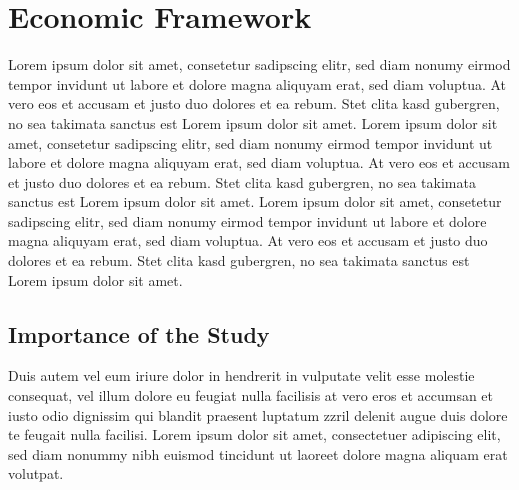 \chapter{Economic Framework}
Lorem ipsum dolor sit amet, consetetur sadipscing elitr,  sed diam nonumy eirmod
tempor invidunt ut labore et dolore magna aliquyam erat, sed diam voluptua. At
vero eos et accusam et justo duo dolores et ea rebum. Stet clita kasd gubergren,
no sea takimata sanctus est Lorem ipsum dolor sit amet. Lorem ipsum dolor sit
amet, consetetur sadipscing elitr,  sed diam nonumy eirmod tempor invidunt ut
labore et dolore magna aliquyam erat, sed diam voluptua. At vero eos et accusam
et justo duo dolores et ea rebum. Stet clita kasd gubergren, no sea takimata
sanctus est Lorem ipsum dolor sit amet. Lorem ipsum dolor sit amet, consetetur
sadipscing elitr,  sed diam nonumy eirmod tempor invidunt ut labore et dolore
magna aliquyam erat, sed diam voluptua. At vero eos et accusam et justo duo
dolores et ea rebum. Stet clita kasd gubergren, no sea takimata sanctus est
Lorem ipsum dolor sit amet.

\section{Importance of the Study}
Duis autem vel eum iriure dolor in hendrerit in vulputate velit esse molestie
consequat, vel illum dolore eu feugiat nulla facilisis at vero eros et accumsan
et iusto odio dignissim qui blandit praesent luptatum zzril delenit augue duis
dolore te feugait nulla facilisi. Lorem ipsum dolor sit amet, consectetuer
adipiscing elit, sed diam nonummy nibh euismod tincidunt ut laoreet dolore
magna aliquam erat volutpat.


